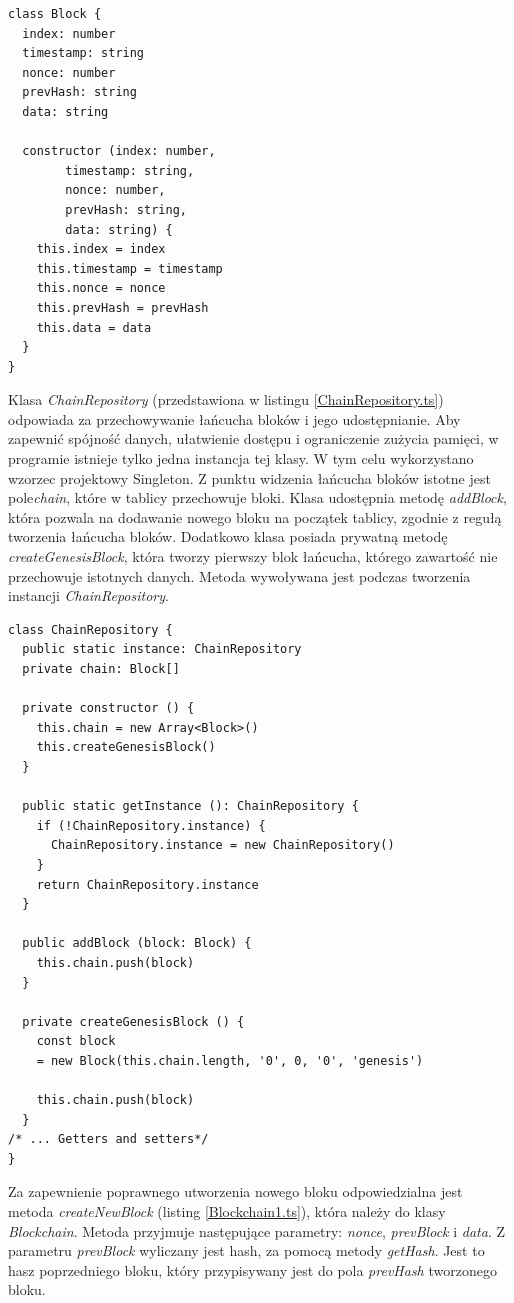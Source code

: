 \documentclass[a4paper,12pt]{book}
\begin{document}
\begin{lstlisting}[style=ES6, caption={Klasa Block.},label={Block.ts}]
class Block {
  index: number
  timestamp: string
  nonce: number
  prevHash: string
  data: string

  constructor (index: number,
 		timestamp: string,
 		nonce: number,
 		prevHash: string,
	 	data: string) {
    this.index = index
    this.timestamp = timestamp
    this.nonce = nonce
    this.prevHash = prevHash
    this.data = data
  }
}
\end{lstlisting}

Klasa \textit{ChainRepository} (przedstawiona w listingu \ref{ChainRepository.ts}) odpowiada za przechowywanie łańcucha bloków i jego udostępnianie. Aby zapewnić spójność danych, ułatwienie dostępu i ograniczenie zużycia pamięci, w programie istnieje tylko jedna instancja tej klasy. W tym celu wykorzystano wzorzec projektowy Singleton. Z punktu widzenia łańcucha bloków istotne jest pole\textit{chain}, które w tablicy przechowuje bloki. Klasa udostępnia metodę \textit{addBlock}, która pozwala na dodawanie nowego bloku na początek tablicy, zgodnie z regułą tworzenia łańcucha bloków. Dodatkowo klasa posiada prywatną metodę \textit{createGenesisBlock}, która tworzy pierwszy blok łańcucha, którego zawartość nie przechowuje istotnych danych. Metoda wywoływana jest podczas tworzenia instancji \textit{ChainRepository}.

\begin{lstlisting}[style=ES6, caption={Klasa ChainRepository.}, label={ChainRepository.ts}]
class ChainRepository {
  public static instance: ChainRepository
  private chain: Block[]

  private constructor () {
    this.chain = new Array<Block>()
    this.createGenesisBlock()
  }

  public static getInstance (): ChainRepository {
    if (!ChainRepository.instance) {
      ChainRepository.instance = new ChainRepository()
    }
    return ChainRepository.instance
  }

  public addBlock (block: Block) {
    this.chain.push(block)
  }

  private createGenesisBlock () {
    const block 
	= new Block(this.chain.length, '0', 0, '0', 'genesis')

    this.chain.push(block)
  }
/* ... Getters and setters*/
}
\end{lstlisting}

Za zapewnienie poprawnego utworzenia nowego bloku odpowiedzialna jest metoda \textit{createNewBlock} (listing \ref{Blockchain1.ts}), która należy do klasy \textit{Blockchain}. Metoda przyjmuje następujące parametry: \textit{nonce}, \textit{prevBlock} i \textit{data}. Z parametru \textit{prevBlock} wyliczany jest hash, za pomocą metody \textit{getHash}. Jest to hasz poprzedniego bloku, który przypisywany jest do pola \textit{prevHash} tworzonego bloku.
\end{document}
